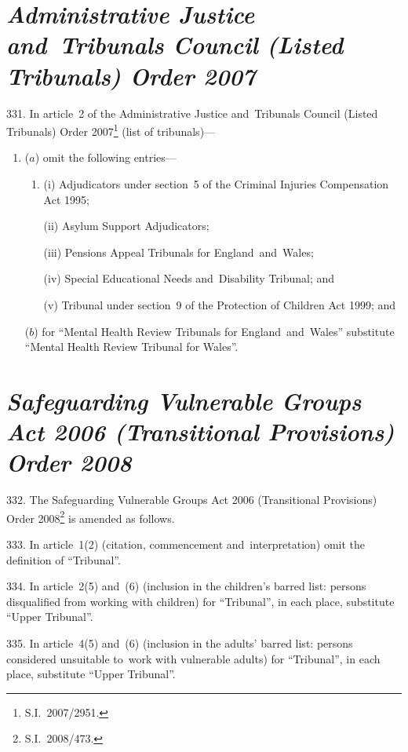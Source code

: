 \documentclass[12pt,a4paper]{article}
\begin{document}
\section*{\itshape Administrative Justice and~Tribunals Council (Listed Tribunals) Order 2007}

331.  In article~2 of the Administrative Justice and~Tribunals Council (Listed Tribunals) Order 2007\footnote{S.I.~2007/2951.} (list of tribunals)—
\begin{enumerate}\item[]
($a$) omit the following entries—
\begin{enumerate}\item[]
(i) Adjudicators under section~5 of the Criminal Injuries Compensation Act 1995;

(ii) Asylum Support Adjudicators;

(iii) Pensions Appeal Tribunals for England~and~Wales;

(iv) Special Educational Needs and~Disability Tribunal; and

(v) Tribunal under section~9 of the Protection of Children Act 1999; and
\end{enumerate}

($b$) for “Mental Health Review Tribunals for England~and~Wales” substitute “Mental Health Review Tribunal for Wales”.
\end{enumerate}

\section*{\itshape\sloppy Safeguarding Vulnerable Groups Act 2006 (Transitional Provisions) Order 2008}

332.  The Safeguarding Vulnerable Groups Act 2006 (Transitional Provisions) Order 2008\footnote{S.I.~2008/473.} is amended as follows.

\medskip

333.  In article~1(2) (citation, commencement and~interpretation) omit the definition of “Tribunal”.

\medskip

334.  In article~2(5) and~(6) (inclusion in the children’s barred list: persons disqualified from working with children) for “Tribunal”, in each place, substitute “Upper Tribunal”.

\medskip

335.  In article~4(5) and~(6) (inclusion in the adults’ barred list: persons considered unsuitable to~work with vulnerable adults) for “Tribunal”, in each place, substitute “Upper Tribunal”.
\end{document}
